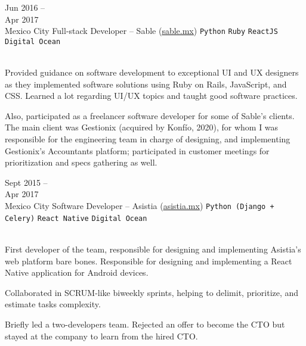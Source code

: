 \documentclass[9pt]{developercv} %
\begin{document}
\begin{entrylist}
{           

        }

    \entry
        {
            Jun 2016 -- \\Apr 2017
            \\\footnotesize{Mexico City}
        }
        {Full-stack Developer – Sable ({\href{https://sable.mx/}{\underline{sable.mx}}})}
        {
            \texttt{Python}
            \slashsep\texttt{Ruby}
            \slashsep\texttt{ReactJS}
            \slashsep\texttt{Digital Ocean}
        }
        {\\
            Provided guidance on software development to exceptional UI and UX designers as they implemented software solutions using Ruby on Rails, JavaScript, and CSS. Learned a lot regarding UI/UX topics and taught good software practices. 

            Also, participated as a freelancer software developer for some of Sable's clients. The main client was Gestionix (acquired by Konfío, 2020), for whom I was responsible for the engineering team in charge of designing, and implementing Gestionix's Accountants platform; participated in customer meetings for prioritization and specs gathering as well.\\
            
        }

    \entry
        {
            Sept 2015 --\\Apr 2017
            \\\footnotesize{Mexico City}
        }
        {Software Developer – Asistia ({\href{https://www.linkedin.com/company/asistia/}{\underline{asistia.mx}}})}
        {
            \texttt{Python (Django + Celery)}
            \slashsep\texttt{React Native}
            \slashsep\texttt{Digital Ocean}
        }
        {\\
            First developer of the team, responsible for designing and implementing Asistia's web platform bare bones. Responsible for designing and implementing a React Native application for Android devices. 

            Collaborated in SCRUM-like biweekly sprints, helping to delimit, prioritize, and estimate tasks complexity.
            
            Briefly led a two-developers team. Rejected an offer to become the CTO but stayed at the company to learn from the hired CTO.\\
        
        }


\end{entrylist}
\end{document}
